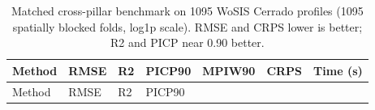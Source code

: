 \documentclass[10pt,letterpaper]{article}
\begin{document}
\begin{longtable}[]{@{}
  >{\raggedright\arraybackslash}p{}
  >{\raggedleft\arraybackslash}p{}
  >{\raggedleft\arraybackslash}p{}
  >{\raggedleft\arraybackslash}p{}
  >{\raggedleft\arraybackslash}p{}
  >{\raggedleft\arraybackslash}p{}
  >{\raggedleft\arraybackslash}p{}@{}}
\caption{Matched cross-pillar benchmark on 1095 WoSIS Cerrado profiles
(1095 spatially blocked folds, log1p scale). RMSE and CRPS lower is
better; R2 and PICP near 0.90 better.}\tabularnewline
\toprule\noalign{}
\begin{minipage}[b]{\linewidth}\raggedright
Method
\end{minipage} & \begin{minipage}[b]{\linewidth}\raggedleft
RMSE
\end{minipage} & \begin{minipage}[b]{\linewidth}\raggedleft
R2
\end{minipage} & \begin{minipage}[b]{\linewidth}\raggedleft
PICP90
\end{minipage} & \begin{minipage}[b]{\linewidth}\raggedleft
MPIW90
\end{minipage} & \begin{minipage}[b]{\linewidth}\raggedleft
CRPS
\end{minipage} & \begin{minipage}[b]{\linewidth}\raggedleft
Time (s)
\end{minipage} \\
\midrule\noalign{}
\endfirsthead
\toprule\noalign{}
\begin{minipage}[b]{\linewidth}\raggedright
Method
\end{minipage} & \begin{minipage}[b]{\linewidth}\raggedleft
RMSE
\end{minipage} & \begin{minipage}[b]{\linewidth}\raggedleft
R2
\end{minipage} & \begin{minipage}[b]{\linewidth}\raggedleft
PICP90
\end{minipage} & \begin{minipage}[b]{\linewidth}\raggedleft

\end{minipage}
\end{longtable}
\end{document}
